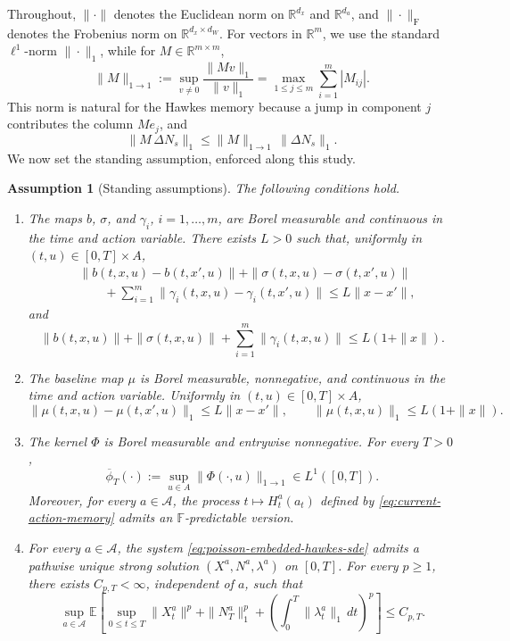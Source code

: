 \documentclass[11pt]{article}
\newtheorem{assumption}{Assumption}[section]
\theoremstyle{remarkitalic}
\theoremstyle{remarkitalic}
\newcommand{\1}{\mathbf 1}
\begin{document}
\noindent Throughout, $\|\cdot\|$ denotes the Euclidean norm on
$\mathbb R^{d_x}$ and $\mathbb R^{d_a}$, and
$\|\cdot\|_{\mathrm F}$ denotes the Frobenius norm on
$\mathbb R^{d_x\times d_W}$. For vectors in $\mathbb R^m$,
we use the standard $\ell^1$-norm $\|\cdot\|_1$, while for
$M\in\mathbb R^{m\times m}$,
\[
    \|M\|_{1\to1}
    :=
    \sup_{v\ne0}\frac{\|Mv\|_1}{\|v\|_1}
    =
    \max_{1\le j\le m}\sum_{i=1}^m |M_{ij}|.
\]
This norm is natural for the Hawkes memory because a jump in component
$j$ contributes the column $Me_j$, and
\[
\|M\,\Delta N_s\|_1
\leq
\|M\|_{1\to1}\,\|\Delta N_s\|_1.
\]
\noindent We now set the standing assumption, enforced along this study. 



\begin{assumption}[Standing assumptions]
\label{ass:standing}
The following conditions hold.
\begin{enumerate}

    \item[(S1)] The maps $b$, $\sigma$, and $\gamma_i$, $i=1,\ldots,m$, are
    Borel measurable and continuous in the time and action variable. There exists
    $L>0$ such that, uniformly in $(t,u)\in[0,T]\times A$,
    \[
    \begin{aligned}
    &\|b(t,x,u)-b(t,x',u)\|
    +\|\sigma(t,x,u)-\sigma(t,x',u)\|
    \\
    &\qquad
    +\sum_{i=1}^m
    \|\gamma_i(t,x,u)-\gamma_i(t,x',u)\|
    \leq L\|x-x'\|,
    \end{aligned}
    \]
    and
    \[
    \|b(t,x,u)\|+\|\sigma(t,x,u)\|
    +\sum_{i=1}^m\|\gamma_i(t,x,u)\|
    \leq L(1+\|x\|).
    \]

    \item[(S2)] The baseline map $\mu$ is Borel measurable, nonnegative, and
    continuous in the time and action variable. Uniformly in
    $(t,u)\in[0,T]\times A$,
    \[
    \|\mu(t,x,u)-\mu(t,x',u)\|_1
    \leq L\|x-x'\|,
    \qquad
    \|\mu(t,x,u)\|_1\leq L(1+\|x\|).
    \]
    \item[(S3)] The kernel $\Phi$ is Borel measurable and entrywise
    nonnegative. For every $T>0$,
    \[
    \overline\phi_T(\cdot)
    :=
    \sup_{u\in A}\|\Phi(\cdot,u)\|_{1\to1}
    \in L^1([0,T]).
    \]
    Moreover, for every $a\in\mathcal A$, the process
    $t\mapsto H_t^a(a_t)$ defined by \eqref{eq:current-action-memory} admits an
    $\mathbb F$-predictable version.

    \item[(S4)] For every $a\in\mathcal A$, the system
    \eqref{eq:poisson-embedded-hawkes-sde} admits a pathwise unique strong solution $(X^a,N^a,\lambda^a)$ on $[0,T]$.
    For every $p\geq1$, there exists $C_{p,T}<\infty$, independent of
    $a$, such that
    \[
    \sup_{a\in\mathcal A}
    \mathbb E\!\left[
       \sup_{0\leq t\leq T}\|X_t^a\|^p
       +\|N_T^a\|_1^p
       +\left(\int_0^T\|\lambda_t^a\|_1\,dt\right)^p
    \right]
    \leq C_{p,T}.
    \]
    \end{enumerate}
\end{assumption}
\end{document}
